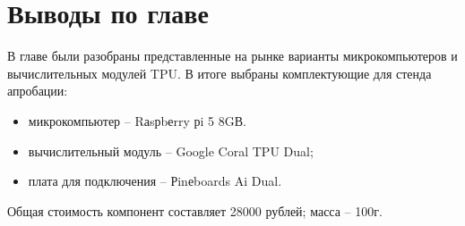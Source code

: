 \section{Выводы по главе}
В главе были разобраны представленные на рынке варианты микрокомпьютеров и вычислительных модулей TPU. В итоге выбраны комплектующие для стенда апробации:
\begin{itemize}
  \item микрокомпьютер -- Rаsрbеrry рi 5 8GВ.
  \item вычислительный модуль -- Google Coral TPU Dual;
  \item плата для подключения -- Рinеboards Ai Dual.
\end{itemize}
Общая стоимость компонент составляет 28000 рублей; масса -- 100г. 